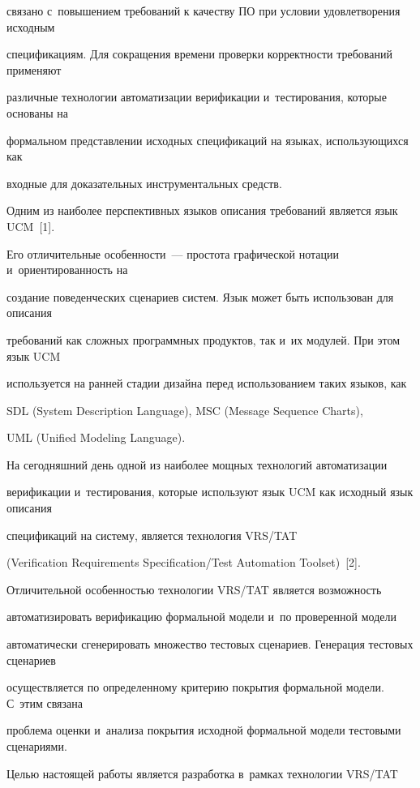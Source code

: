 связано с~повышением требований к качеству ПО при условии удовлетворения исходным

спецификациям. Для сокращения времени проверки корректности требований применяют

различные технологии автоматизации верификации и~тестирования, которые основаны на

формальном представлении исходных спецификаций на языках, использующихся как

входные для доказательных инструментальных средств.



  Одним из наиболее перспективных языков описания требований является язык UCM~[1].

Его отличительные особенности~--- простота графической нотации и~ориентированность на

создание поведенческих сценариев систем. Язык может быть использован для описания

требований как сложных программных продуктов, так и~их модулей. При этом язык UCM

используется на ранней стадии дизайна перед использованием таких языков, как

SDL (System Description Language), MSC (Message Sequence Charts),

UML (Unified Modeling Language).

На сегодняшний день одной из наиболее мощных технологий автоматизации

верификации и~тестирования, которые используют язык UCM как исходный язык описания

спецификаций на систему, является технология VRS/TAT

(Verification Requirements Specification/Test Automation Toolset)~[2].



  Отличительной особенностью технологии VRS/TAT является возможность

автоматизировать верификацию формальной модели и~по проверенной модели

автоматически сгенерировать множество тестовых сценариев. Генерация тестовых сценариев

осуществляется по определенному критерию покрытия формальной модели. С~этим связана

проблема оценки и~анализа покрытия исходной формальной модели тестовыми сценариями.



  Целью настоящей работы является разработка в~рамках технологии VRS/TAT


